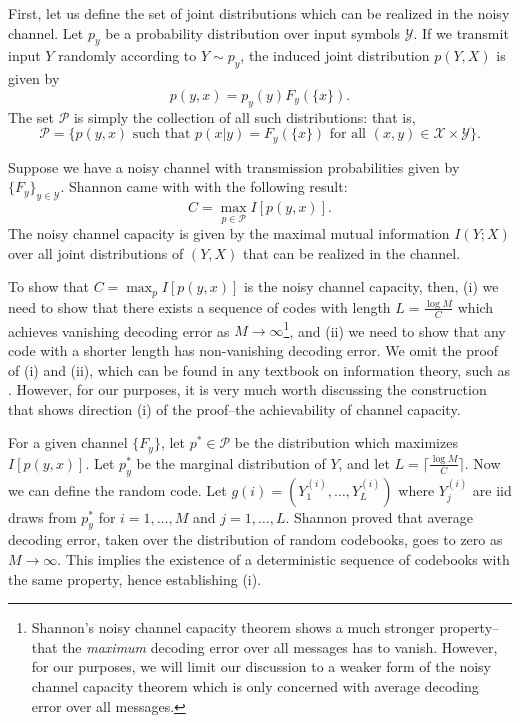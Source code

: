 First, let us define the set of joint distributions which can be
realized in the noisy channel.  Let $p_y$ be a probability
distribution over input symbols $\mathcal{Y}$.  If we transmit input
$Y$ randomly according to $Y \sim p_y$, the induced joint distribution
$p(Y, X)$ is given by
\[
p(y, x) = p_y(y) F_y(\{x\}).
\]
The set $\mathcal{P}$ is simply the collection of all such distributions: that is,
\[
\mathcal{P} = \{p(y, x) \text{ such that } p(x|y) = F_y(\{x\})\text{ for all }(x, y) \in \mathcal{X} \times \mathcal{Y}\}.
\]

Suppose we have a noisy channel with transmission probabilities given by $\{F_y\}_{y \in \mathcal{Y}}$.
Shannon came with with the following result:
\[
C = \max_{p\in \mathcal{P}} I[p(y, x)].
\]
The noisy channel capacity is given by the maximal mutual information
$I(Y; X)$ over all joint distributions of $(Y, X)$ that can be
realized in the channel.

To show that $C = \max_p I[p(y, x)]$ is the noisy channel capacity,
then, (i) we need to show that there exists a sequence of codes with
length $L = \frac{\log M}{C}$ which achieves vanishing decoding error
as $M \to \infty$\footnote{Shannon's noisy channel capacity theorem
  shows a much stronger property--that the \emph{maximum} decoding
  error over all messages has to vanish.  However, for our purposes,
  we will limit our discussion to a weaker form of the noisy channel
  capacity theorem which is only concerned with average decoding error
  over all messages.}, and (ii) we need to show that any code with a
shorter length has non-vanishing decoding error.  We omit the proof of
(i) and (ii), which can be found in any textbook on information
theory, such as \cite{Cover2006}.  However, for our purposes, it is
very much worth discussing the construction that shows direction (i)
of the proof--the achievability of channel capacity.

For a given channel $\{F_y\}$, let $p^* \in \mathcal{P}$ be the
distribution which maximizes $I[p(y, x)]$.  Let $p^*_y$ be the
marginal distribution of $Y$, and let $L = \lceil \frac{\log M}{C}
\rceil$.  Now we can define the random code.  Let $g(i) =
(Y_1^{(i)},\hdots, Y_L^{(i)})$ where $Y_j^{(i)}$ are iid draws from
$p^*_y$ for $i = 1,\hdots, M$ and $j = 1,\hdots, L$.  Shannon proved
that average decoding error, taken over the distribution of random
codebooks, goes to zero as $M \to \infty$.  This implies the existence
of a deterministic sequence of codebooks with the same property, hence
establishing (i).



